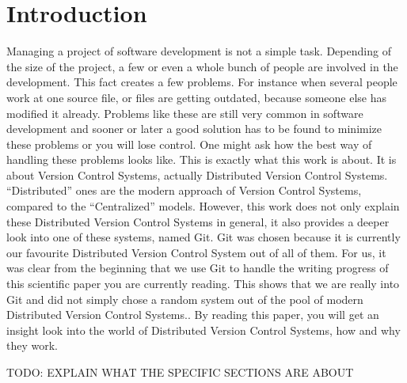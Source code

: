 \section {Introduction}

Managing a project of software development is not a simple task. Depending of the size of the project, a few or even a whole bunch of people are involved in the development. This fact creates a few problems. For instance when several people work at one source file, or files are getting outdated, because someone else has modified it already. Problems like these are still very common in software development and sooner or later a good solution has to be found to minimize these problems or you will lose control. One might ask how the best way of handling these problems looks like.
This is exactly what this work is about. It is about Version Control Systems, actually Distributed Version Control Systems. "`Distributed"' ones are the modern approach of Version Control Systems, compared to the "`Centralized"' models. However, this work does not only explain these Distributed Version Control Systems in general, it also provides a deeper look into one of these systems, named Git.
Git was chosen because it is currently our favourite Distributed Version Control System out of all of them. For us, it was clear from the beginning that we use Git to handle the writing progress of this scientific paper you are currently reading. This shows that we are really into Git and did not simply chose a random system out of the pool of modern Distributed Version Control Systems..
By reading this paper, you will get an insight look into the world of Distributed Version Control Systems, how and why they work.

TODO: EXPLAIN WHAT THE SPECIFIC SECTIONS ARE ABOUT